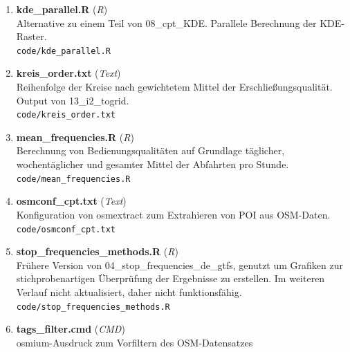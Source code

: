 \begin{enumerate}[label=B\arabic*, ref=B\arabic*, leftmargin=*, itemsep=0.5em, topsep=0.3em]
\begin{enumerate}[label=B\arabic{enumi}-\arabic*, ref=B\arabic{enumi}-\arabic*, leftmargin=*, itemsep=0.5em, topsep=0.3em]
\texttt{\small code/impedance\_functions.R}
\edef\appendixlabelkey{app:B\arabic{enumi}-\arabic{enumii}}
\expandafter\label\expandafter{\appendixlabelkey}
\item \textbf{kde\_parallel.R} \textnormal{(\textit{R})}\\
Alternative zu einem Teil von 08\_cpt\_KDE. Parallele Berechnung der KDE-Raster.\\
\texttt{\small code/kde\_parallel.R}
\edef\appendixlabelkey{app:B\arabic{enumi}-\arabic{enumii}}
\expandafter\label\expandafter{\appendixlabelkey}
\item \textbf{kreis\_order.txt} \textnormal{(\textit{Text})}\\
Reihenfolge der Kreise nach gewichtetem Mittel der Erschließungsqualität. Output von 13\_i2\_togrid.\\
\texttt{\small code/kreis\_order.txt}
\edef\appendixlabelkey{app:B\arabic{enumi}-\arabic{enumii}}
\expandafter\label\expandafter{\appendixlabelkey}
\item \textbf{mean\_frequencies.R} \textnormal{(\textit{R})}\\
Berechnung von Bedienungsqualitäten auf Grundlage täglicher, wochentäglicher und gesamter Mittel der Abfahrten pro Stunde.\\
\texttt{\small code/mean\_frequencies.R}
\edef\appendixlabelkey{app:B\arabic{enumi}-\arabic{enumii}}
\expandafter\label\expandafter{\appendixlabelkey}
\item \textbf{osmconf\_cpt.txt} \textnormal{(\textit{Text})}\\
Konfiguration von osmextract zum Extrahieren von POI aus OSM-Daten.\\
\texttt{\small code/osmconf\_cpt.txt}
\edef\appendixlabelkey{app:B\arabic{enumi}-\arabic{enumii}}
\expandafter\label\expandafter{\appendixlabelkey}
\item \textbf{stop\_frequencies\_methods.R} \textnormal{(\textit{R})}\\
Frühere Version von 04\_stop\_frequencies\_de\_gtfs, genutzt um Grafiken zur stichprobenartigen Überprüfung der Ergebnisse zu erstellen.
Im weiteren Verlauf nicht aktualisiert, daher nicht funktionsfähig.\\
\texttt{\small code/stop\_frequencies\_methods.R}
\edef\appendixlabelkey{app:B\arabic{enumi}-\arabic{enumii}}
\expandafter\label\expandafter{\appendixlabelkey}
\item \textbf{tags\_filter.cmd} \textnormal{(\textit{CMD})}\\
osmium-Ausdruck zum Vorfiltern des OSM-Datensatzes\\

\end{enumerate}
\end{enumerate}
